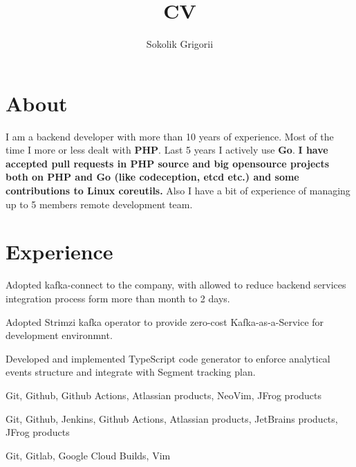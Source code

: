 \documentclass{cv}
\title {CV}
\author{Sokolik Grigorii}
\begin{document}
\maketitle

\section* {About}
I am a backend developer with more than 10 years of experience. Most of the
time I more or less dealt with \textbf{PHP}. Last 5 years I actively use
\textbf{Go}. \textbf{I have accepted pull requests in PHP source and big
opensource projects both on PHP and Go (like codeception, etcd etc.) and some
contributions to Linux coreutils.} Also I have a bit of experience of managing
up to 5 members remote development team.


\section* {Experience}
    \begin{gaas}
      \item Adopted kafka-connect to the company, with allowed to reduce
        backend services integration process form more than month to 2 days.
      \item Adopted Strimzi kafka operator to provide zero-cost
        Kafka-as-a-Service for development environmnt.
      \item Developed and implemented TypeScript code generator to enforce
        analytical events structure and integrate with Segment tracking plan.
    \end{gaas}
    \devtools
      Git, Github, Github Actions, Atlassian products, NeoVim, JFrog products

    \devtools
      Git, Github, Jenkins, Github Actions, Atlassian products, JetBrains
      products, JFrog products

    \devtools
      Git, Gitlab, Google Cloud Builds, Vim
\end{document}
